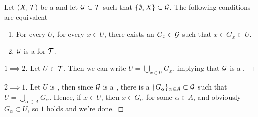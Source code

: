 \begin{prop}
    \label{prop:TopologyBasisCharacterization}
    Let $(X,\mathcal{T})$ be a 
    \TopologicalSpace 
    and let 
    $\mathcal{G} \subset \mathcal{T}$ 
    such that $\{\emptyset, X \} \subset \mathcal{G}$. 
    The following conditions are equivalent
    \begin{enumerate}
        \item For every
            \SetOpen
            $U$, 
            for every $x \in U$, 
            there exists an
            $G_x \in \mathcal{G}$
            such that 
            $x \in G_x \subset U$. 
        \item $\mathcal{G}$  is a \TopologyBasis for $\mathcal{T}$. 
    \end{enumerate}
    \begin{proof}[$1 \implies 2$]
        Let $U \in \mathcal{T}$. Then we can write $U = \bigcup_{x \in U} G_x$, implying that $\mathcal{G}$ is a \TopologyBasis. 
    \end{proof}
    \begin{proof}[$2 \implies 1$]
        Let $U$ is \SetOpen, then since 
        $\mathcal{G}$ is a \TopologyBasis, 
        there is a $\{G_{\alpha}\}_{\alpha \in A} \subset \mathcal{G}$ such that 
        $U = \bigcup_{\alpha \in A} G_{\alpha}$. 
        Hence, if $x \in U$, then 
        $x \in G_{\alpha}$ for some $\alpha \in A$, and obviously $G_{\alpha} \subset U$, 
        so $1$ holds and we're done. 
    \end{proof}
\end{prop}
